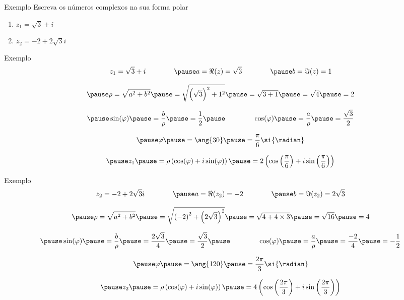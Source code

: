 \addtocounter{exemplo}{1}
\begin{frame}{Exemplo \theexemplo}
  Escreva os números complexos na sua forma polar
  \begin{enumerate}
    \item \(z_1 = \sqrt{3} + i\)
    \item \(z_2 = -2 + 2\sqrt{3}i\)
  \end{enumerate}
\end{frame}

\begin{frame}{Exemplo \theexemplo}
  \[
    z_1 = \sqrt{3} + i
    \qquad\qquad
    \pause
    a = \Re(z) = \sqrt{3}
    \qquad\qquad
    \pause
    b = \Im(z) = 1
  \]

  \[
    \pause
    \rho
    = \sqrt{a^2 + b^2}
    \pause
    = \sqrt{\left(\sqrt{3}\right)^2 + 1^2}
    \pause
    = \sqrt{3+1}
    \pause
    = \sqrt{4}
    \pause
    = 2
  \]

  \[
    \pause
    \sin(\varphi)
    \pause
    = \frac{b}{\rho}
    \pause
    = \frac{1}{2}
    \pause
    \qquad\qquad
    \cos(\varphi)
    \pause
    = \frac{a}{\rho}
    \pause
    = \frac{\sqrt{3}}{2}
  \]

  \[
    \pause
    \varphi
    \pause
    = \ang{30}
    \pause
    = \frac{\pi}{6} \si{\radian}
  \]

  \[
    \pause
    z_1
    \pause
    = \rho\left(\cos(\varphi)+i\sin(\varphi)\right)
    \pause
    = 2\left(\cos\left(\frac{\pi}{6}\right)+i\sin\left(\frac{\pi}{6}\right)\right)
  \]
\end{frame}

\begin{frame}{Exemplo \theexemplo}
\[
  z_2 = -2 + 2\sqrt{3}i
  \qquad\qquad
  \pause
  a = \Re(z_2) = -2
  \qquad\qquad
  \pause
  b = \Im(z_2) = 2\sqrt{3}
\]

\[
  \pause
  \rho
  = \sqrt{a^2 + b^2}
  \pause
  = \sqrt{\left(-2\right)^2 + \left(2\sqrt{3}\right)^2}
  \pause
  = \sqrt{4+4\times 3}
  \pause
  = \sqrt{16}
  \pause
  = 4
\]

\[
  \pause
  \sin(\varphi)
  \pause
  = \frac{b}{\rho}
  \pause
  = \frac{2\sqrt{3}}{4}
  \pause
  = \frac{\sqrt{3}}{2}
  \pause
  \qquad\qquad
  \cos(\varphi)
  \pause
  = \frac{a}{\rho}
  \pause
  = \frac{-2}{4}
  \pause
  = -\frac{1}{2}
\]

\[
  \pause
  \varphi
  \pause
  = \ang{120}
  \pause
  = \frac{2\pi}{3} \si{\radian}
\]

\[
  \pause
  z_2
  \pause
  = \rho\left(\cos(\varphi)+i\sin(\varphi)\right)
  \pause
  = 4\left(\cos\left(\frac{2\pi}{3}\right)+i\sin\left(\frac{2\pi}{3}\right)\right)
\]
\end{frame}

